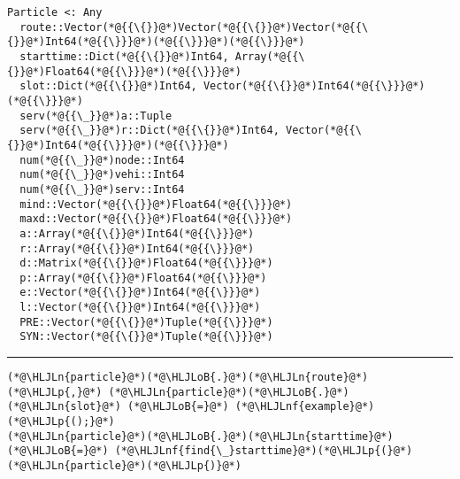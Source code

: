 \documentclass[12pt,a4paper]{article}
\newcommand{\HLJLn}[1]{#1}
\newcommand{\HLJLnf}[1]{\textcolor[RGB]{66,102,213}{#1}}
\newcommand{\HLJLoB}[1]{\textcolor[RGB]{102,102,102}{\textbf{#1}}}
\newcommand{\HLJLp}[1]{#1}
\begin{document}
\begin{lstlisting}
Particle <: Any
  route::Vector(*@{{\{}}@*)Vector(*@{{\{}}@*)Vector(*@{{\{}}@*)Int64(*@{{\}}}@*)(*@{{\}}}@*)(*@{{\}}}@*)
  starttime::Dict(*@{{\{}}@*)Int64, Array(*@{{\{}}@*)Float64(*@{{\}}}@*)(*@{{\}}}@*)
  slot::Dict(*@{{\{}}@*)Int64, Vector(*@{{\{}}@*)Int64(*@{{\}}}@*)(*@{{\}}}@*)
  serv(*@{{\_}}@*)a::Tuple
  serv(*@{{\_}}@*)r::Dict(*@{{\{}}@*)Int64, Vector(*@{{\{}}@*)Int64(*@{{\}}}@*)(*@{{\}}}@*)
  num(*@{{\_}}@*)node::Int64
  num(*@{{\_}}@*)vehi::Int64
  num(*@{{\_}}@*)serv::Int64
  mind::Vector(*@{{\{}}@*)Float64(*@{{\}}}@*)
  maxd::Vector(*@{{\{}}@*)Float64(*@{{\}}}@*)
  a::Array(*@{{\{}}@*)Int64(*@{{\}}}@*)
  r::Array(*@{{\{}}@*)Int64(*@{{\}}}@*)
  d::Matrix(*@{{\{}}@*)Float64(*@{{\}}}@*)
  p::Array(*@{{\{}}@*)Float64(*@{{\}}}@*)
  e::Vector(*@{{\{}}@*)Int64(*@{{\}}}@*)
  l::Vector(*@{{\{}}@*)Int64(*@{{\}}}@*)
  PRE::Vector(*@{{\{}}@*)Tuple(*@{{\}}}@*)
  SYN::Vector(*@{{\{}}@*)Tuple(*@{{\}}}@*)
\end{lstlisting}


\rule{\textwidth}{1pt}

\begin{lstlisting}
(*@\HLJLn{particle}@*)(*@\HLJLoB{.}@*)(*@\HLJLn{route}@*)(*@\HLJLp{,}@*) (*@\HLJLn{particle}@*)(*@\HLJLoB{.}@*)(*@\HLJLn{slot}@*) (*@\HLJLoB{=}@*) (*@\HLJLnf{example}@*)(*@\HLJLp{();}@*)
(*@\HLJLn{particle}@*)(*@\HLJLoB{.}@*)(*@\HLJLn{starttime}@*) (*@\HLJLoB{=}@*) (*@\HLJLnf{find{\_}starttime}@*)(*@\HLJLp{(}@*)(*@\HLJLn{particle}@*)(*@\HLJLp{)}@*)
\end{lstlisting}
\end{document}
